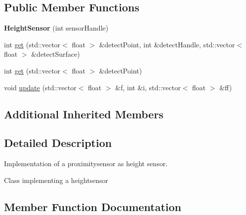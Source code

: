 \subsection*{Public Member Functions}
\begin{DoxyCompactItemize}
\item 
{\bfseries Height\+Sensor} (int sensor\+Handle)\hypertarget{classHeightSensor_adce900c49d253c6e9cd85db00c2f0708}{}\label{classHeightSensor_adce900c49d253c6e9cd85db00c2f0708}

\item 
int \hyperlink{classHeightSensor_abd4b7d4cc5906a971da402757989f5da}{get} (std\+::vector$<$ float $>$ \&detect\+Point, int \&detect\+Handle, std\+::vector$<$ float $>$ \&detect\+Surface)
\item 
int \hyperlink{classHeightSensor_a90a19e600e5b89a503366da0f0c35590}{get} (std\+::vector$<$ float $>$ \&detect\+Point)
\item 
void \hyperlink{classHeightSensor_a6966090886a414a6213125c91a31e128}{update} (std\+::vector$<$ float $>$ \&f, int \&i, std\+::vector$<$ float $>$ \&ff)
\end{DoxyCompactItemize}
\subsection*{Additional Inherited Members}


\subsection{Detailed Description}
Implementation of a proximitysensor as height sensor. 

Class implementing a heightsensor 

\subsection{Member Function Documentation}
